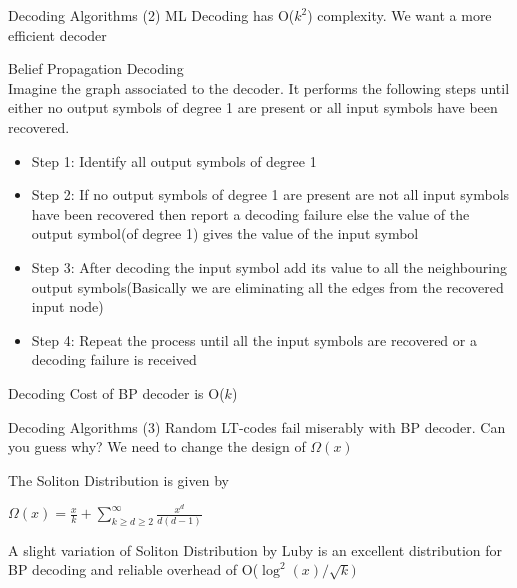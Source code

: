 \documentclass[handout,11pt]{beamer}
\begin{document}
\begin{frame}{Decoding Algorithms (2)}
ML Decoding has O($k^2$) complexity. We want a more efficient decoder

Belief Propagation Decoding\\

Imagine the graph associated to the decoder. It performs the following steps until either no output symbols of degree 1 are present or all input symbols have been recovered.

\begin{itemize}
\item Step 1: Identify all output symbols of degree 1
\pause
\item Step 2: If no output symbols of degree 1 are present are not all input symbols have been recovered then report a decoding failure else the value of the output symbol(of degree 1) gives the value of the input symbol
\pause
\item Step 3: After decoding the input symbol add its value to all the neighbouring output symbols(Basically we are eliminating all the edges from the recovered input node)
\pause
\item Step 4: Repeat the process until all the input symbols are recovered or a decoding failure is received
\end{itemize}

Decoding Cost of BP decoder is O($k$)

\end{frame}

\begin{frame}{Decoding Algorithms (3)}
Random LT-codes fail miserably with BP decoder. Can you guess why?
\pause
We need to change the design of $\Omega(x)$

The Soliton Distribution is given by

$\Omega\left (x \right)=\frac{x}{k} + \sum_{k\ge d\ge2}^{\infty}\frac{x^d}{d(d-1)}$ 

\pause

A slight variation of Soliton Distribution by Luby is an excellent distribution for BP decoding and reliable overhead of O($\log^2\left (x \right)/\sqrt k)$
\end{frame}
\end{document}

